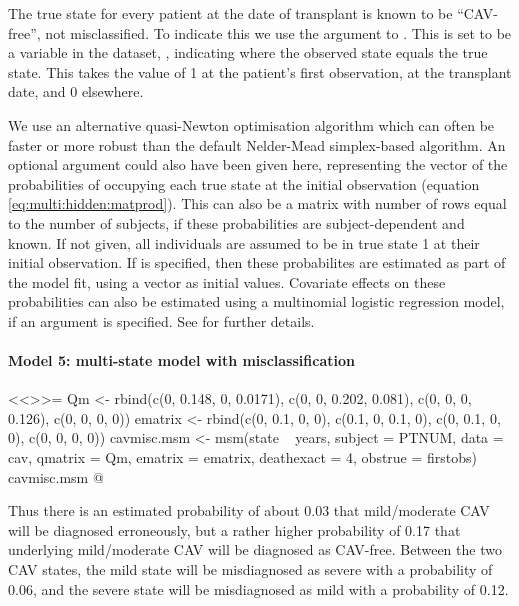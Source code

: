 The true state for every patient at the date of transplant is known to
be ``CAV-free'', not misclassified.  To indicate this we use the
argument  to .  This is set to be a
variable in the dataset, , indicating where the
observed state equals the true state.  This takes the value of 1 at
the patient's first observation, at the transplant date, and 0
elsewhere.

We use an alternative quasi-Newton optimisation algorithm
 which can often be faster or more robust
than the default Nelder-Mead simplex-based algorithm.  An optional
argument  could also have been given here,
representing the vector of the probabilities of occupying each true
state at the initial observation
(equation \ref{eq:multi:hidden:matprod}).  This can also be a matrix
with number of rows equal to the number of subjects, if these
probabilities are subject-dependent and known. If not given, all
individuals are assumed to be in true state 1 at their initial
observation.  If  is specified, then these
probabilites are estimated as part of the model fit, using
a vector  as initial values.  Covariate effects on these
probabilities can also be estimated using a multinomial logistic
regression model, if an  argument is
specified.  See  for further details.


\paragraph{Model 5: multi-state model with misclassification}

<<>>=
Qm <- rbind(c(0, 0.148, 0, 0.0171),
            c(0, 0, 0.202, 0.081),
            c(0, 0, 0, 0.126),
            c(0, 0, 0, 0))
ematrix <- rbind(c(0, 0.1, 0, 0),
                 c(0.1, 0, 0.1, 0),
                 c(0, 0.1, 0, 0),
                 c(0, 0, 0, 0))
cavmisc.msm <- msm(state ~ years, subject = PTNUM, data = cav,
                   qmatrix = Qm, ematrix = ematrix, deathexact = 4,
                   obstrue = firstobs)
cavmisc.msm
@

Thus there is an estimated probability of about 0.03 that
mild/moderate CAV will be diagnosed erroneously, but a rather higher
probability of 0.17 that underlying mild/moderate CAV will be
diagnosed as CAV-free.  Between the two CAV states, the mild state
will be misdiagnosed as severe with a probability of 0.06, and the
severe state will be misdiagnosed as mild with a probability of 0.12.

